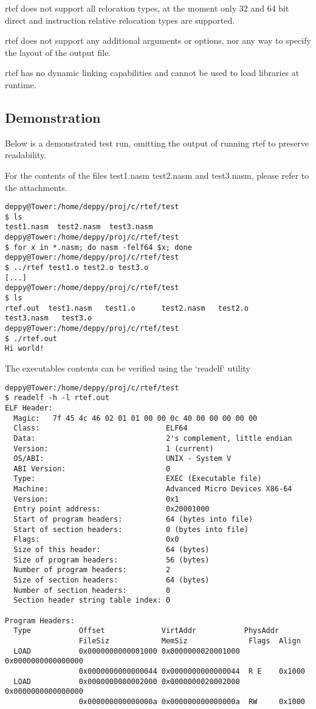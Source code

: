 \documentclass{article}
\begin{document}
rtef does not support all relocation types, at the moment only 32 and 64 bit direct and instruction relative relocation types are supported.

rtef does not support any additional arguments or options, nor any way to specify the layout of the output file.

rtef has no dynamic linking capabilities and cannot be used to load libraries at runtime.

\subsection{Demonstration}

Below is a demonstrated test run, omitting the output of running rtef to preserve readability.

For the contents of the files test1.nasm test2.nasm and test3.nasm, please refer to the attachments.

\begin{verbatim}
deppy@Tower:/home/deppy/proj/c/rtef/test
$ ls
test1.nasm  test2.nasm  test3.nasm
deppy@Tower:/home/deppy/proj/c/rtef/test
$ for x in *.nasm; do nasm -felf64 $x; done
deppy@Tower:/home/deppy/proj/c/rtef/test
$ ../rtef test1.o test2.o test3.o
[...]
deppy@Tower:/home/deppy/proj/c/rtef/test
$ ls
rtef.out  test1.nasm   test1.o      test2.nasm   test2.o      test3.nasm   test3.o
deppy@Tower:/home/deppy/proj/c/rtef/test
$ ./rtef.out
Hi world!
\end{verbatim}

The executables contents can be verified using the `readelf` utility

\begin{verbatim}
deppy@Tower:/home/deppy/proj/c/rtef/test
$ readelf -h -l rtef.out
ELF Header:
  Magic:   7f 45 4c 46 02 01 01 00 00 0c 40 00 00 00 00 00
  Class:                             ELF64
  Data:                              2's complement, little endian
  Version:                           1 (current)
  OS/ABI:                            UNIX - System V
  ABI Version:                       0
  Type:                              EXEC (Executable file)
  Machine:                           Advanced Micro Devices X86-64
  Version:                           0x1
  Entry point address:               0x20001000
  Start of program headers:          64 (bytes into file)
  Start of section headers:          0 (bytes into file)
  Flags:                             0x0
  Size of this header:               64 (bytes)
  Size of program headers:           56 (bytes)
  Number of program headers:         2
  Size of section headers:           64 (bytes)
  Number of section headers:         0
  Section header string table index: 0

Program Headers:
  Type           Offset             VirtAddr           PhysAddr
                 FileSiz            MemSiz              Flags  Align
  LOAD           0x0000000000001000 0x0000000020001000 0x0000000000000000
                 0x0000000000000044 0x0000000000000044  R E    0x1000
  LOAD           0x0000000000002000 0x0000000020002000 0x0000000000000000
                 0x000000000000000a 0x000000000000000a  RW     0x1000
\end{verbatim}
\end{document}
